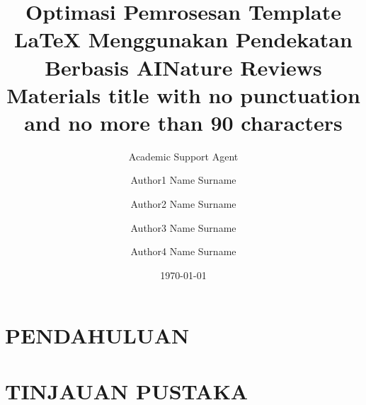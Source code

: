 \documentclass{wlscirep}
\title{Optimasi Pemrosesan Template LaTeX Menggunakan Pendekatan Berbasis AI}
\author{Academic Support Agent}
\date{\today}
\begin{document}
\maketitle

\begin{abstract}

\end{abstract}

\chapter{PENDAHULUAN}


\chapter{TINJAUAN PUSTAKA}


\usepackage[utf8]{inputenc}
\usepackage[T1]{fontenc}
\usepackage{bm}
\title{Nature Reviews Materials title with no punctuation and no more than 90 characters}

\author[1,*]{Author1 Name Surname}
\author[2]{Author2 Name Surname}
\author[1,2]{Author3 Name Surname}
\author[2]{Author4 Name Surname}

\end{document}
